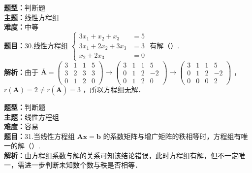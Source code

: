 \documentclass{ctexart}
\newenvironment{question}[5]{%
	\noindent\textbf{题型：}#1\\
	\textbf{主题：}#2\\
	\textbf{难度：}#3\\
	\textbf{题目：}#4\\
	\textbf{解析：}#5\\
	\vspace{1em}
}{}
\begin{document}
	\begin{question}
		{判断题}
		{线性方程组}
		{中等}
		{30.线性方程组 \(\left\{\begin{aligned} 3 x_1+x_2+x_3 & =5 \\ 3 x_1+2 x_2+3 x_3 & =3 \\ x_2+2 x_3 & =0\end{aligned}\right.\) 有解（）. }
		{由于 \(\overline{\mathbf{A}}=\left(\begin{array}{lll|l}3 & 1 & 1 & 5 \\ 3 & 2 & 3 & 3 \\ 0 & 1 & 2 & 0\end{array}\right) \rightarrow\left(\begin{array}{lll|l}3 & 1 & 1 & 5 \\ 0 & 1 & 2 & -2 \\ 0 & 1 & 2 & 0\end{array}\right) \rightarrow\left(\begin{array}{lll|l}3 & 1 & 1 & 5 \\ 0 & 1 & 2 & -2 \\ 0 & 0 & 0 & 2\end{array}\right)\) ，\(r(\mathbf{A})=2 \neq r(\overline{\mathbf{A}})=3\) ，所以方程组无解．}
	\end{question}
	
	\begin{question}
		{判断题}
		{线性方程组}
		{容易}
		{31.当线性方程组 \(\mathbf{A} \mathbf{x}=\mathbf{b}\) 的系数矩阵与增广矩阵的秩相等时，方程组有唯一的解（）. }
		{由方程组系数与解的关系可知该结论错误，此时方程组有解，但不一定唯一，需进一步判断未知数个数与秩是否相等．}
	\end{question}
	
\end{document}
